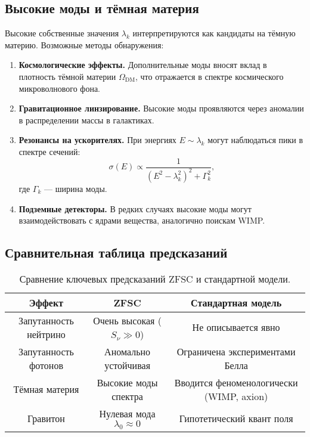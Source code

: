 \documentclass[12pt,a4paper]{article}
\begin{document}
\subsection{Высокие моды и тёмная материя}
Высокие собственные значения $\lambda_k$ интерпретируются как кандидаты на тёмную материю.
Возможные методы обнаружения:
\begin{enumerate}
  \item \textbf{Космологические эффекты.} Дополнительные моды вносят вклад в плотность тёмной материи $\Omega_{\mathrm{DM}}$, что отражается в спектре космического микроволнового фона.
  \item \textbf{Гравитационное линзирование.} Высокие моды проявляются через аномалии в распределении массы в галактиках.
  \item \textbf{Резонансы на ускорителях.} При энергиях $E \sim \lambda_k$ могут наблюдаться пики в спектре сечений:
  \[
  \sigma(E) \propto \frac{1}{(E^2 - \lambda_k^2)^2 + \Gamma_k^2},
  \]
  где $\Gamma_k$ --- ширина моды.
  \item \textbf{Подземные детекторы.} В редких случаях высокие моды могут взаимодействовать с ядрами вещества, аналогично поискам WIMP.
\end{enumerate}

\subsection{Сравнительная таблица предсказаний}

\begin{table}[h!]
\centering
\begin{tabular}{|c|c|c|}
\hline
\textbf{Эффект} & \textbf{ZFSC} & \textbf{Стандартная модель} \\
\hline
Запутанность нейтрино & Очень высокая ($S_\nu \gg 0$) & Не описывается явно \\
Запутанность фотонов & Аномально устойчивая & Ограничена экспериментами Белла \\
Тёмная материя & Высокие моды спектра & Вводится феноменологически (WIMP, axion) \\
Гравитон & Нулевая мода $\lambda_0 \approx 0$ & Гипотетический квант поля \\
\hline
\end{tabular}
\caption{Сравнение ключевых предсказаний ZFSC и стандартной модели.}
\end{table}
\end{document}

